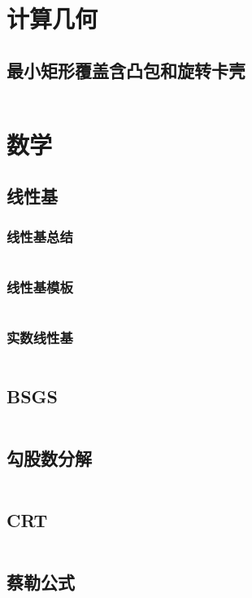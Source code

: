 \documentclass{article}
\begin{document}
\newpage
\section{计算几何}
\subsection{最小矩形覆盖含凸包和旋转卡壳}
\inputminted[breaklines]{c++}{../计算几何/最小矩形覆盖含凸包和旋转卡壳.cpp}

\newpage
\section{数学}
\subsection{线性基}
\subsubsection{线性基总结}
\inputminted[breaklines]{text}{../数学/线性基总结.txt}

\subsubsection{线性基模板}
\inputminted[breaklines]{c++}{../数学/线性基模板.cpp}

\subsubsection{实数线性基}
\inputminted[breaklines]{c++}{../数学/实数线性基.cpp}

\subsection{BSGS}
\inputminted[breaklines]{c++}{../数学/BSGS.cpp}

\subsection{勾股数分解}
\inputminted[breaklines]{c++}{../数学/勾股数.cpp}

\subsection{CRT}
\inputminted[breaklines]{c++}{../数学/CRT.cpp}

\subsection{蔡勒公式}
\inputminted[breaklines]{c++}{../数学/蔡勒公式.cpp}
\end{document}
